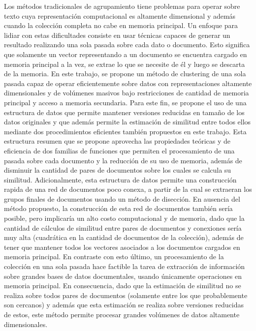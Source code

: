 \documentclass[10pt]{article}
\begin{document}
Los métodos tradicionales de agrupamiento tiene problemas para operar sobre texto cuya representación computacional es altamente dimensional y además cuando la colección completa no cabe en memoria principal. Un enfoque para lidiar con estas dificultades consiste en usar técnicas capaces de generar un resultado realizando una sola pasada sobre cada dato o documento. Esto significa que solamente un vector representando a un documento se encuentra cargado en memoria principal a la vez, se extrae lo que se necesite de él y luego se descarta de la memoria. En este trabajo, se propone un método de clustering de una sola pasada capaz de operar eficientemente sobre datos con representaciones altamente dimensionales y de volúmenes masivos bajo restricciones de cantidad de memoria principal y acceso a memoria secundaria. Para este fin, se propone el uso de una estructura de datos que permite mantener versiones reducidas en tamaño de los datos originales y que además permite la estimación de similitud entre todos ellos mediante dos procedimientos eficientes también propuestos en este trabajo. Esta estructura resumen que se propone aprovecha las propiedades teóricas y de eficiencia de dos familias de funciones que permiten el procesamiento de una pasada sobre cada documento y la reducción de su uso de memoria, además de disminuir la cantidad de pares de documentos sobre los cuales se calcula su similitud. Adicionalmente, esta estructura de datos permite una construcción rapida de una red de documentos poco conexa, a partir de la cual se extraeran los grupos finales de documentos usando un método de disección. En ausencia del método propuesto, la construcción de esta red de documentos también sería posible, pero implicaría un alto costo computacional y de memoria, dado que la cantidad de cálculos de similitud entre pares de documentos y conexiones sería muy alta (cuadrática en la cantidad de documentos de la colección), además de tener que mantener todos los vectores asociados a los documentos cargados en memoria principal. En contraste con esto último, un procesamiento de la colección en una sola pasada hace factible la tarea de extracción de información sobre grandes bases de datos documentales, usando únicamente operaciones en memoria principal. En consecuencia, dado que la estimación de similitud no se realiza sobre todos pares de documentos (solamente entre los que probablemente son cercanos) y además que esta estimación se realiza sobre versiones reducidas de estos, este método permite procesar grandes volúmenes de datos altamente dimensionales.
\end{document}
